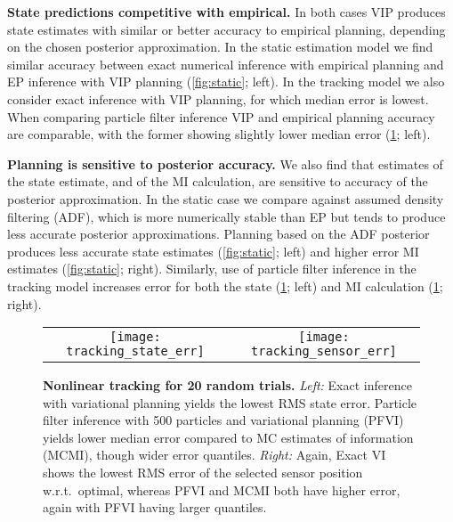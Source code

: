 
\textbf{State predictions competitive with empirical.}  In both cases
VIP produces state estimates with similar or better accuracy to
empirical planning, depending on the chosen posterior approximation.
In the static estimation model we find similar accuracy between exact
numerical inference with empirical planning and EP inference with VIP
planning (\FIG\ref{fig:static}; left).  In the tracking model we also
consider exact inference with VIP planning, for which median error is
lowest.  When comparing particle filter inference VIP and empirical
planning accuracy are comparable, with the former showing slightly
lower median error (\FIG\ref{fig:dynamic}; left).

\textbf{Planning is sensitive to posterior accuracy.}  We also find
that estimates of the state estimate, and of the MI calculation, are
sensitive to accuracy of the posterior approximation.  In the static
case we compare against assumed density filtering (ADF), which is more
numerically stable than EP but tends to produce less accurate
posterior approximations.  Planning based on the ADF posterior
produces less accurate state estimates (\FIG\ref{fig:static}; left)
and higher error MI estimates (\FIG\ref{fig:static}; right).
Similarly, use of particle filter inference in the tracking model
increases error for both the state (\FIG\ref{fig:dynamic}; left) and
MI calculation (\FIG\ref{fig:dynamic}; right).



\begin{figure}[t]
  \centering
  \begin{tabular}{cc}
    \hspace{-3mm}\texttt{[image: tracking\_state\_err]} &
    \hspace{-3mm}\texttt{[image: tracking\_sensor\_err]}
  \end{tabular}
  
  \caption{\small\textbf{Nonlinear tracking for 20 random
  trials.}  \emph{Left:} Exact inference with variational planning
  yields the lowest RMS state error.  Particle filter inference with
  500 particles and variational planning (PFVI) yields lower median
  error compared to MC estimates of information (MCMI), though wider
  error quantiles.  \emph{Right:} Again, Exact VI shows the lowest RMS
  error of the selected sensor position w.r.t.~optimal, whereas PFVI
  and MCMI both have higher error, again with PFVI having larger
  quantiles.}
  \vspace{-4mm}
  \label{fig:dynamic}

\end{figure}





